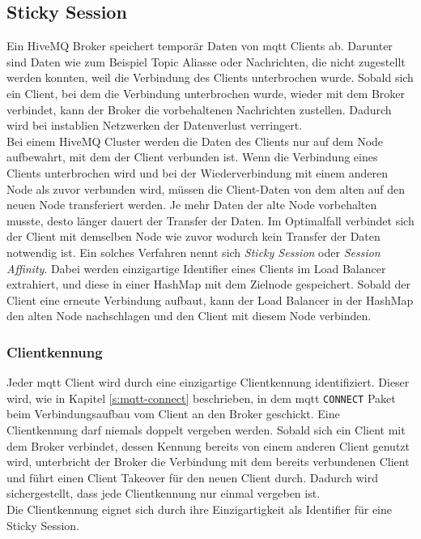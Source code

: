 \subsection{Sticky Session} \label{ss:sticky-session}
Ein HiveMQ Broker speichert temporär Daten von \ac{mqtt} Clients ab. Darunter sind Daten wie zum Beispiel Topic Aliasse oder Nachrichten, die nicht zugestellt werden konnten, weil die Verbindung des Clients unterbrochen wurde. Sobald sich ein Client, bei dem die Verbindung unterbrochen wurde, wieder mit dem Broker verbindet, kann der Broker die vorbehaltenen Nachrichten zustellen. Dadurch wird bei instablien Netzwerken der Datenverlust verringert.
\\
Bei einem HiveMQ Cluster werden die Daten des Clients nur auf dem Node aufbewahrt, mit dem der Client verbunden ist. Wenn die Verbindung eines Clients unterbrochen wird und bei der Wiederverbindung mit einem anderen Node als zuvor verbunden wird, müssen die Client-Daten von dem alten auf den neuen Node transferiert werden. Je mehr Daten der alte Node vorbehalten musste, desto länger dauert der Transfer der Daten.
Im Optimalfall verbindet sich der Client mit demselben Node wie zuvor wodurch kein Transfer der Daten notwendig ist.
Ein solches Verfahren nennt sich \textit{Sticky Session} oder \textit{Session Affinity}. Dabei werden einzigartige Identifier eines Clients im Load Balancer extrahiert, und diese in einer HashMap mit dem Zielnode gespeichert. Sobald der Client eine erneute Verbindung aufbaut, kann der Load Balancer in der HashMap den alten Node nachschlagen und den Client mit diesem Node verbinden. \cite{WhatDoesTerm}

\subsubsection{Clientkennung} \label{ss:clientid}
Jeder \ac{mqtt} Client wird durch eine einzigartige Clientkennung identifiziert. Dieser wird, wie in Kapitel \ref{s:mqtt-connect} beschrieben, in dem \ac{mqtt} \verb|CONNECT| Paket beim Verbindungsaufbau vom Client an den Broker geschickt.
Eine Clientkennung darf niemals doppelt vergeben werden. Sobald sich ein Client mit dem Broker verbindet, dessen Kennung bereits von einem anderen Client genutzt wird, unterbricht der Broker die Verbindung mit dem bereits verbundenen Client und führt einen Client Takeover für den neuen Client durch. Dadurch wird sichergestellt, dass jede Clientkennung nur einmal vergeben ist.
\\
Die Clientkennung eignet sich durch ihre Einzigartigkeit als Identifier für eine Sticky Session.

